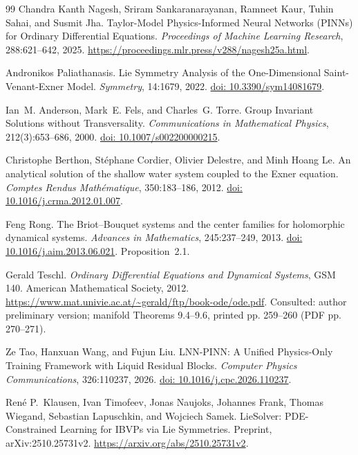 \documentclass[12pt,a4paper,oneside]{report}
\numberwithin{equation}{chapter}
\theoremstyle{definition}
\theoremstyle{remark}\newtheorem{remark}[theorem]{Remark}
\newcommand{\doi}[1]{\href{https://doi.org/#1}{doi: #1}}
\begin{document}
\begin{thebibliography}{99}
Chandra Kanth Nagesh, Sriram Sankaranarayanan, Ramneet Kaur, Tuhin Sahai, and Susmit Jha.
Taylor-Model Physics-Informed Neural Networks (PINNs) for Ordinary Differential Equations.
\emph{Proceedings of Machine Learning Research}, 288:621--642, 2025.
\url{https://proceedings.mlr.press/v288/nagesh25a.html}.

Andronikos Paliathanasis. Lie Symmetry Analysis of the One-Dimensional Saint-Venant-Exner Model. \emph{Symmetry}, 14:1679, 2022. \doi{10.3390/sym14081679}.

Ian~M. Anderson, Mark~E. Fels, and Charles~G. Torre. Group Invariant Solutions without Transversality. \emph{Communications in Mathematical Physics}, 212(3):653--686, 2000. \doi{10.1007/s002200000215}.

Christophe Berthon, St\'ephane Cordier, Olivier Delestre, and Minh Hoang Le. An analytical solution of the shallow water system coupled to the Exner equation. \emph{Comptes Rendus Math\'ematique}, 350:183--186, 2012. \doi{10.1016/j.crma.2012.01.007}.

Feng Rong. The Briot--Bouquet systems and the center families for holomorphic dynamical systems. \emph{Advances in Mathematics}, 245:237--249, 2013. \doi{10.1016/j.aim.2013.06.021}. Proposition~2.1.

Gerald Teschl. \emph{Ordinary Differential Equations and Dynamical Systems}, GSM 140. American Mathematical Society, 2012. \url{https://www.mat.univie.ac.at/~gerald/ftp/book-ode/ode.pdf}. Consulted: author preliminary version; manifold Theorems 9.4--9.6, printed pp. 259--260 (PDF pp. 270--271).

Ze Tao, Hanxuan Wang, and Fujun Liu. LNN-PINN: A Unified Physics-Only Training Framework with Liquid Residual Blocks. \emph{Computer Physics Communications}, 326:110237, 2026. \doi{10.1016/j.cpc.2026.110237}.

Ren\'e P.~Klausen, Ivan Timofeev, Jonas Naujoks, Johannes Frank, Thomas Wiegand, Sebastian Lapuschkin, and Wojciech Samek.
LieSolver: PDE-Constrained Learning for IBVPs via Lie Symmetries.
Preprint, arXiv:2510.25731v2. \url{https://arxiv.org/abs/2510.25731v2}.

\end{thebibliography}
\end{document}
